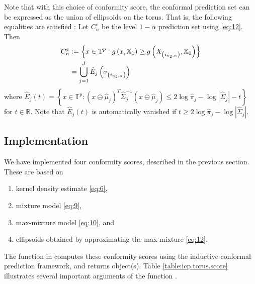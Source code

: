 Note that with this choice of conformity score, the conformal prediction set can be expressed as the union of ellipsoids on the torus. That is, the following equalities are satisfied \citep{Shin:2019, Jung:2021}: Let $C_n^e$ be the level $1-\alpha$ prediction set using \eqref{eq:12}. Then
\begin{align}\notag
    C^e_n&:=\left\{x\in\mathbb{T}^p:g\left(x,\mathbb{X}_{1}\right)\ge g\left(X_{\left(i_{n_2,\alpha}\right)},\mathbb{X}_{1}\right)\right\}\\\label{eq:14}
    &=\bigcup_{j=1}^J\hat{E}_j\left(\sigma_{\left(i_{n_2,\alpha}\right)}\right)
\end{align}
where $\hat{E}_j\left(t\right)=\left\{x\in\mathbb{T}^p:\left(x\ominus\hat{\mu}_j\right)^T\hat{\Sigma}_j^{-1}\left(x\ominus\hat{\mu}_j\right)\le 2\log\hat{\pi}_j-\log\left|\hat{\Sigma}_j\right| - t\right\}$ for $t\in\mathbb{R}$. Note that $\hat{E}_j\left(t\right)$ is automatically vanished if $t\ge 2\log\hat{\pi}_j-\log\left|\hat{\Sigma}_j\right|$.



\subsection{Implementation}

We have implemented four conformity scores,  described in the previous section. These are based on
\begin{enumerate}
    \item kernel density estimate \eqref{eq:6},
    \item mixture model \eqref{eq:9},
    \item max-mixture model \eqref{eq:10}, and
    \item ellipsoids obtained by approximating the max-mixture \eqref{eq:12}.
\end{enumerate}
The function  in  computes these conformity scores using the inductive conformal prediction framework, and returns  object(s). Table \ref{table:icp.torus.score} illustrates several important arguments of the function .

